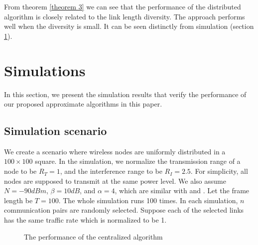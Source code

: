 \documentclass[conference]{IEEEtran}
\begin{document}
From theorem \ref{theorem 3} we can see that the performance of the
distributed algorithm is closely related to the link length
diversity. The approach performs well when the diversity is small.
It can be seen distinctly from simulation (section \ref{section6}).
\section{Simulations}\label{section6}
In this section, we present the simulation results that verify the
performance of our proposed approximate algorithms in this paper.
\subsection{Simulation scenario}
We create a scenario where wireless nodes are uniformly distributed
in a $100\times 100$ square. In the simulation, we normalize the
transmission range of a node to be $R_T=1$, and the interference
range to be $R_I = 2.5$. For simplicity, all nodes are supposed to
transmit at the same power level. We also assume $N=-90dBm$, $\beta
=10dB$, and $\alpha=4$, which are similar with \cite{behzad2003pgb}
and \cite{yi2007optimal}. Let the frame length be $T=100$. The whole
simulation runs 100 times. In each simulation, $n$ communication
pairs are randomly selected. Suppose each of the selected links has
the same traffic rate which is normalized to be 1.
\begin{figure}[tbhp!]
\centerline{ \hfil {}}

\centerline{  \hfil
{}}
\label{Fig:centrlized algorithm} \caption{The performance of the
centralized algorithm}
\end{figure}
\end{document}
